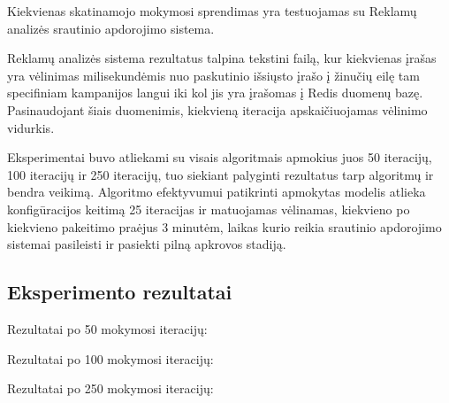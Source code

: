\documentclass{VUMIFPSbakalaurinis}
\begin{document}
Kiekvienas skatinamojo mokymosi sprendimas yra testuojamas su Reklamų analizės srautinio apdorojimo sistema.

Reklamų analizės sistema rezultatus talpina tekstini failą, kur kiekvienas įrašas yra vėlinimas milisekundėmis nuo paskutinio išsiųsto įrašo į žinučių eilę tam specifiniam kampanijos langui iki kol jis yra įrašomas į Redis duomenų bazę. Pasinaudojant šiais duomenimis, kiekvieną iteracija apskaičiuojamas vėlinimo vidurkis. 

Eksperimentai buvo atliekami su visais algoritmais apmokius juos 50 iteracijų, 100 iteracijų ir 250 iteracijų, tuo siekiant palyginti rezultatus tarp algoritmų ir bendra veikimą. Algoritmo efektyvumui patikrinti apmokytas modelis atlieka konfigūracijos keitimą 25 iteracijas ir matuojamas vėlinamas, kiekvieno po kiekvieno pakeitimo praėjus 3 minutėm, laikas kurio reikia srautinio apdorojimo sistemai pasileisti ir pasiekti pilną apkrovos stadiją.

\subsection{Eksperimento rezultatai}

Rezultatai po 50 mokymosi iteracijų:


Rezultatai po 100 mokymosi iteracijų:


Rezultatai po 250 mokymosi iteracijų:




\printbibliography[heading=bibintoc] 
\end{document}
